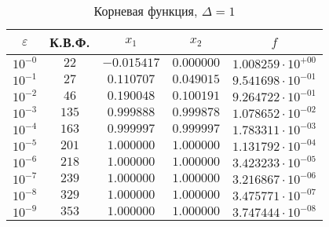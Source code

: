 \documentclass[a4paper,12pt,notitlepage,pdftex,headsepline]{scrartcl}
\begin{document}
        \begin{table}[ht]
          \centering
          \caption{Корневая функция, $\Delta = 1$}
          \begin{tabular}{|c|c|c|c|c|}
            \hline
            $\varepsilon$ & К.В.Ф. & $x_1$ & $x_2$ & $f$\\
            \hline
            $10^{-0}$ & $22$ & $-0.015417$ & $0.000000$ & $1.008259\cdot 10^{+00}$\\
            $10^{-1}$ & $27$ & $0.110707$ & $0.049015$ & $9.541698\cdot 10^{-01}$\\
            $10^{-2}$ & $46$ & $0.190048$ & $0.100191$ & $9.264722\cdot 10^{-01}$\\
            $10^{-3}$ & $135$ & $0.999888$ & $0.999878$ & $1.078652\cdot 10^{-02}$\\
            $10^{-4}$ & $163$ & $0.999997$ & $0.999997$ & $1.783311\cdot 10^{-03}$\\
            $10^{-5}$ & $201$ & $1.000000$ & $1.000000$ & $1.131792\cdot 10^{-04}$\\
            $10^{-6}$ & $218$ & $1.000000$ & $1.000000$ & $3.423233\cdot 10^{-05}$\\
            $10^{-7}$ & $239$ & $1.000000$ & $1.000000$ & $3.216867\cdot 10^{-06}$\\
            $10^{-8}$ & $329$ & $1.000000$ & $1.000000$ & $3.475771\cdot 10^{-07}$\\
            $10^{-9}$ & $353$ & $1.000000$ & $1.000000$ & $3.747444\cdot 10^{-08}$\\
            \hline
          \end{tabular}
        \end{table}
\end{document}
